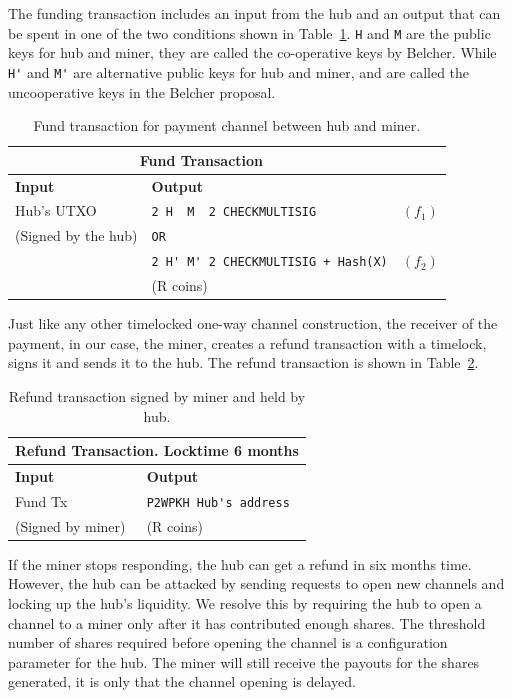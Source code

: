 \documentclass{article}
\begin{document}
The funding transaction includes an input from the hub and an output
that can be spent in one of the two conditions shown in
Table~\ref{fund-tx}. \verb|H| and \verb|M| are the public keys for hub
and miner, they are called the co-operative keys by Belcher. While
\verb|H'| and \verb|M'| are alternative public keys for hub and miner,
and are called the uncooperative keys in the Belcher proposal.


\begin{table}
  \centering
  \begin{tabular}{ llr }
    \multicolumn{2}{c}{\bfseries Fund Transaction} \\
    \midrule
    \bfseries Input & \bfseries Output \\
    \midrule
    Hub's UTXO & \verb|2 H  M  2 CHECKMULTISIG| & $(f_1)$ \\
    (Signed by the hub) & \verb|OR| \\
                    & \verb|2 H' M' 2 CHECKMULTISIG + Hash(X)| & $(f_2)$ \\
    & (R coins) \\
    \midrule
  \end{tabular}
  \caption{Fund transaction for payment channel between hub and miner.}\label{fund-tx}
\end{table}


Just like any other timelocked one-way channel construction, the
receiver of the payment, in our case, the miner, creates a refund
transaction with a timelock, signs it and sends it to the hub. The
refund transaction is shown in Table~\ref{refund-tx}.

\begin{table}
  \centering
  \begin{tabular}{ ll }
    \multicolumn{2}{c}{\bfseries Refund Transaction. Locktime 6 months} \\
    \midrule
    \bfseries Input & \bfseries Output \\
    \midrule
    Fund Tx & \verb|P2WPKH Hub's address| \\
    (Signed by miner) & (R coins) \\
    \midrule
  \end{tabular}
  \caption{Refund transaction signed by miner and held by
    hub.}\label{refund-tx}
\end{table}

If the miner stops responding, the hub can get a refund in six months
time. However, the hub can be attacked by sending requests to open new
channels and locking up the hub's liquidity. We resolve this by
requiring the hub to open a channel to a miner only after it has
contributed enough shares. The threshold number of shares required
before opening the channel is a configuration parameter for the
hub. The miner will still receive the payouts for the shares
generated, it is only that the channel opening is delayed.
\end{document}
